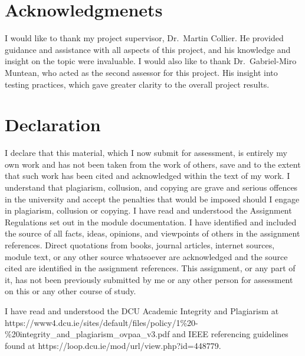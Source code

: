 \documentclass[11pt,a4paper,headinclude=false,footinclude=false]{scrreprt}
\begin{document}


\setcounter{secnumdepth}{1}
\setcounter{tocdepth}{1}
\tableofcontents
\listoftables
\listoffigures
\chapter{Acknowledgmenets}\label{acknowledgmenets}

I would like to thank my project supervisor, Dr.~Martin Collier. He
provided guidance and assistance with all aspects of this project, and
his knowledge and insight on the topic were invaluable. I would also
like to thank Dr.~Gabriel-Miro Muntean, who acted as the second assessor
for this project. His insight into testing practices, which gave greater
clarity to the overall project results.

\begingroup
\renewcommand{\cleardoublepage}{} \renewcommand{\clearpage}{}

\chapter{Declaration}\label{declaration}

\endgroup

I declare that this material, which I now submit for assessment, is
entirely my own work and has not been taken from the work of others,
save and to the extent that such work has been cited and acknowledged
within the text of my work. I understand that plagiarism, collusion, and
copying are grave and serious offences in the university and accept the
penalties that would be imposed should I engage in plagiarism, collusion
or copying. I have read and understood the Assignment Regulations set
out in the module documentation. I have identified and included the
source of all facts, ideas, opinions, and viewpoints of others in the
assignment references. Direct quotations from books, journal articles,
internet sources, module text, or any other source whatsoever are
acknowledged and the source cited are identified in the assignment
references. This assignment, or any part of it, has not been previously
submitted by me or any other person for assessment on this or any other
course of study.

I have read and understood the DCU Academic Integrity and Plagiarism at
https://www4.dcu.ie/sites/default/files/policy/1\%20-\%20integrity\_and\_plagiarism\hspace{0pt}\_ovpaa\_v3.pdf
and IEEE referencing guidelines found at
https://loop.dcu.ie/mod/url\hspace{0pt}/view.php?id=448779.
\end{document}
